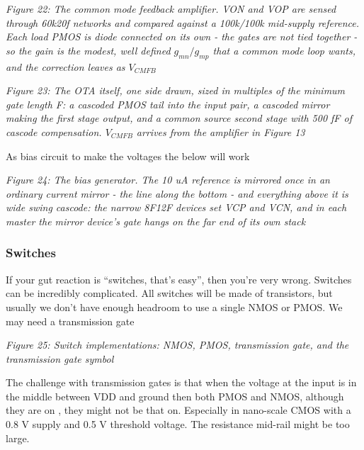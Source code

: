 {
\centering
{}
}

\emph{Figure 22: The common mode feedback amplifier. VON and VOP are
sensed through 60k\textbar\textbar20f networks and compared against a
100k/100k mid-supply reference. Each load PMOS is diode connected on its
own - the gates are not tied together - so the gain is the modest, well
defined \(g_{mn}/g_{mp}\) that a common mode loop wants, and the
correction leaves as \(V_{CMFB}\)}


{
\centering
{}
}

\emph{Figure 23: The OTA itself, one side drawn, sized in multiples of
the minimum gate length F: a cascoded PMOS tail into the input pair, a
cascoded mirror making the first stage output, and a common source
second stage with 500 fF of cascode compensation. \(V_{CMFB}\) arrives
from the amplifier in Figure 13}

As bias circuit to make the voltages the below will work


{
\centering
{}
}

\emph{Figure 24: The bias generator. The 10 uA reference is mirrored
once in an ordinary current mirror - the line along the bottom - and
everything above it is wide swing cascode: the narrow 8F12F devices set
VCP and VCN, and in each master the mirror device's gate hangs on the
far end of its own stack}

\subsubsection{Switches}\label{switches}

If your gut reaction is ``switches, that's easy'', then you're very
wrong. Switches can be incredibly complicated. All switches will be made
of transistors, but usually we don't have enough headroom to use a
single NMOS or PMOS. We may need a transmission gate


{
\centering
{}
}

\emph{Figure 25: Switch implementations: NMOS, PMOS, transmission gate,
and the transmission gate symbol}

The challenge with transmission gates is that when the voltage at the
input is in the middle between VDD and ground then both PMOS and NMOS,
although they are on , they might not be that on. Especially in
nano-scale CMOS with a 0.8 V supply and 0.5 V threshold voltage. The
resistance mid-rail might be too large.

